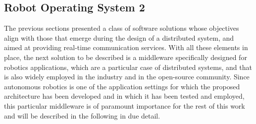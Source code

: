 \subsection{Robot Operating System 2}
\label{sec:ros2}
The previous sections presented a class of software solutions whose objectives align with those that emerge during the design of a distributed system, and aimed at providing real-time communication services. With all these elements in place, the next solution to be described is a middleware specifically designed for robotics applications, which are a particular case of distributed systems, and that is also widely employed in the industry and in the open-source community. Since autonomous robotics is one of the application settings for which the proposed architecture has been developed and in which it has been tested and employed, this particular middleware is of paramount importance for the rest of this work and will be described in the following in due detail.

